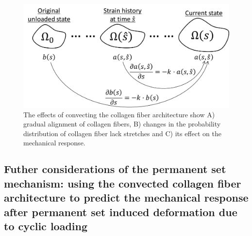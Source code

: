 
\begin{figure}[hbt]
\centering
\centerline{\includegraphics[width=0.75\paperwidth]{Images/chapter4/figure9}}
\caption{The effects of convecting the collagen fiber architecture show A) gradual alignment of collagen fibers, B) changes in the probability distribution of collagen fiber lack stretches and C) its effect on the mechanical response.}
\label{fig:effectsofconvection}
\end{figure}

\subsection{Futher considerations of the permanent set mechanism: using the convected collagen fiber architecture to predict the mechanical response after permanent set induced deformation due to cyclic loading}

